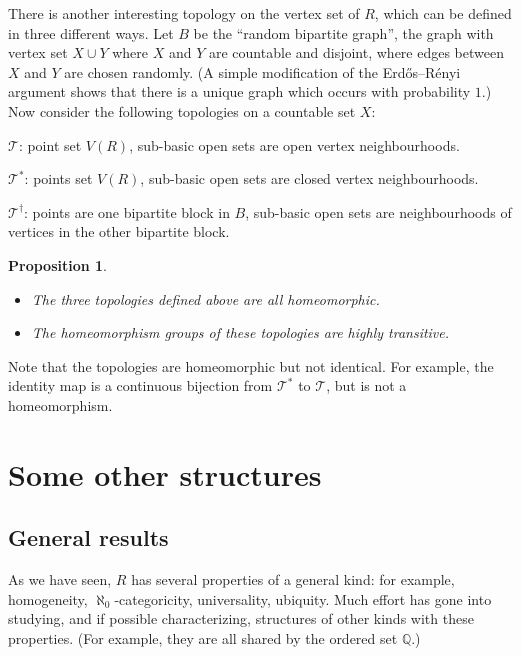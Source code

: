 \documentclass[12pt]{article}
\newtheorem{proposition}{Proposition}
\begin{document}
There is another interesting topology on the vertex set of $R$, which can be
defined in three different ways. Let $B$ be the ``random bipartite graph'',
the graph with vertex set $X\cup Y$ where $X$ and $Y$ are countable and
disjoint, where edges between $X$ and $Y$ are chosen randomly. (A simple
modification of the Erd\H{o}s--R\'enyi argument shows that there is a unique
graph which occurs with probability $1$.) Now consider the following
topologies on a countable set $X$:
\begin{description}
\item{$\mathcal{T}$:} point set $V(R)$, sub-basic open sets are
open vertex neighbourhoods.
\item{$\mathcal{T}^*$:} points set $V(R)$, sub-basic open sets are
closed vertex neighbourhoods.
\item{$\mathcal{T}^\dag$:} points are one bipartite block in $B$, sub-basic
open sets are neighbourhoods of vertices in the other bipartite block.
\end{description}

\begin{proposition}
\begin{itemize}
\item[(a)] The three topologies defined above are all homeomorphic.
\item[(b)] The homeomorphism groups of these topologies are highly transitive.
\end{itemize}
\end{proposition}

Note that the topologies are homeomorphic but not identical. For example,
the identity map is a continuous bijection from $\mathcal{T}^*$ to
$\mathcal{T}$, but is not a homeomorphism.

\section{Some other structures}%
\label{ch32:sec2.10}

\subsection{General results}

As we have seen, $R$ has several properties of a general kind: for
example, homogeneity, $\aleph_0$-categoricity, universality,
ubiquity. Much effort has gone into studying, and if possible
characterizing, structures of other kinds with these properties.
(For example, they are all shared by the ordered set $\mathbb{Q}$.)
\end{document}
